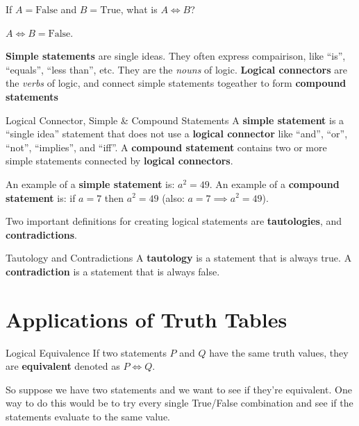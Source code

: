 \begin{boxexample}{}{}
	If $A=\text{False}$ and $B=\text{True}$, what is $A \iff B$?
	
	$A \iff B = \text{False}$.
\end{boxexample}

{\bf Simple statements} are single ideas. They often express compairison, like ``is'', ``equals'', ``less than'', etc. They are the \emph{nouns} of logic. {\bf Logical connectors} are the \emph{verbs} of logic, and connect simple statements togeather to form {\bf compound statements}

\begin{boxdefine}{Logical Connector, Simple \& Compound Statements}{}
	A {\bf simple statement} is a ``single idea'' statement that does not use a {\bf logical connector} like ``and'', ``or'', ``not'', ``implies'', and ``iff''.
	A {\bf compound statement} contains two or more simple statements connected by {\bf logical connectors}.
\end{boxdefine}

\begin{boxexample}{}{}
	An example of a {\bf simple statement} is: $a^2=49$. An example of a {\bf compound statement} is: if $a=7$ then $a^2=49$ (also: $a=7 \implies a^2=49$). 
\end{boxexample}

Two important definitions for creating logical statements are {\bf tautologies}, and {\bf contradictions}.

\begin{boxdefine}{Tautology and Contradictions}{}
	A {\bf tautology} is a statement that is always true. A {\bf contradiction} is a statement that is always false.
\end{boxdefine}

\section{Applications of Truth Tables}

\begin{boxdefine}{Logical Equivalence}{}
	If two statements $P$ and $Q$ have the same truth values, they are {\bf equivalent} denoted as $P \iff Q$.
\end{boxdefine}

So suppose we have two statements and we want to see if they're equivalent. One way to do this would be to try every single True/False combination and see if the statements evaluate to the same value.


